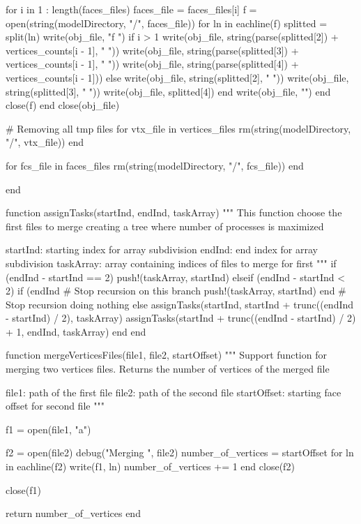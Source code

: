 \documentclass[11pt,oneside]{article}	%
\begin{document}
{  for i in 1 : length(faces_files)
    faces_file = faces_files[i]
    f = open(string(modelDirectory, "/", faces_file))
    for ln in eachline(f)
      splitted = split(ln)
      write(obj_file, "f ")
      if i > 1
        write(obj_file, string(parse(splitted[2]) + vertices_counts[i - 1], " "))
        write(obj_file, string(parse(splitted[3]) + vertices_counts[i - 1], " "))
        write(obj_file, string(parse(splitted[4]) + vertices_counts[i - 1]))
      else
        write(obj_file, string(splitted[2], " "))
        write(obj_file, string(splitted[3], " "))
        write(obj_file, splitted[4])
      end
      write(obj_file, "\n")
    end
    close(f)
  end
  close(obj_file)

  # Removing all tmp files
  for vtx_file in vertices_files
    rm(string(modelDirectory, "/", vtx_file))
  end

  for fcs_file in faces_files
    rm(string(modelDirectory, "/", fcs_file))
  end

end

function assignTasks(startInd, endInd, taskArray)
  """
  This function choose the first files to merge
  creating a tree where number of processes is maximized

  startInd: starting index for array subdivision
  endInd: end index for array subdivision
  taskArray: array containing indices of files to merge for first
  """
  if (endInd - startInd == 2)
    push!(taskArray, startInd)
  elseif (endInd - startInd < 2)
    if (endInd %
      # Stop recursion on this branch
      push!(taskArray, startInd)
    end
    # Stop recursion doing nothing
  else
    assignTasks(startInd, startInd + trunc((endInd - startInd) / 2), taskArray)
    assignTasks(startInd + trunc((endInd - startInd) / 2) + 1, endInd, taskArray)
  end
end

function mergeVerticesFiles(file1, file2, startOffset)
  """
  Support function for merging two vertices files.
  Returns the number of vertices of the merged file

  file1: path of the first file
  file2: path of the second file
  startOffset: starting face offset for second file
  """

  f1 = open(file1, "a")

  f2 = open(file2)
  debug("Merging ", file2)
  number_of_vertices = startOffset
  for ln in eachline(f2)
    write(f1, ln)
    number_of_vertices += 1
  end
  close(f2)

  close(f1)

  return number_of_vertices
end


}
\end{document}
